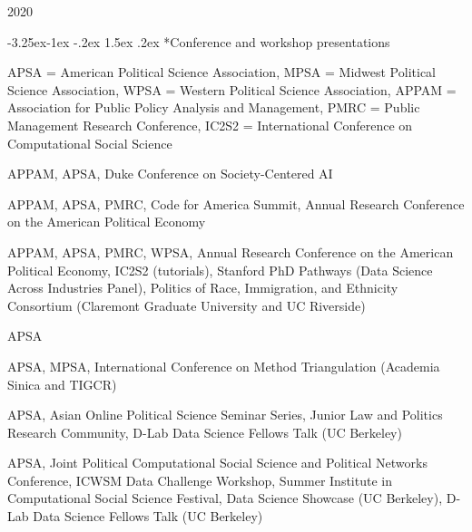 \documentclass[10pt, letterpaper]{article}
\makeatletter
\newenvironment{yearrow}[1]{%
  \begin{list}{}{%
    \setlength{\leftmargin}{4.4em}%
    \setlength{\labelwidth}{4.1em}%
    \setlength{\labelsep}{0.3em}%
    \setlength{\topsep}{0.3\baselineskip}%
    \setlength{\partopsep}{0pt}%
    \setlength{\itemsep}{0pt}%
    \setlength{\parsep}{0pt}%
  }%
  \item[{\textbf{#1}\hfill}]%
}{\end{list}}
\renewcommand\subsection{\@startsection{subsection}{2}{\z@}%
  {-3.25ex\@plus -1ex \@minus -.2ex}%
  {1.5ex \@plus .2ex}%
  {\normalfont\large\bfseries\color{cvnavy}}}
\makeatother
\begin{document}
\begin{talkyear}{2020}
\end{talkyear}

\subsection*{Conference and workshop presentations}

{\small APSA = American Political Science Association, MPSA = Midwest Political Science Association, WPSA = Western Political Science Association, APPAM = Association for Public Policy Analysis and Management, PMRC = Public Management Research Conference, IC2S2 = International Conference on Computational Social Science}

\begin{yearrow}{2026}
APPAM, APSA, Duke Conference on Society-Centered AI
\end{yearrow}

\begin{yearrow}{2025}
APPAM, APSA, PMRC, Code for America Summit, Annual Research Conference on the American Political Economy
\end{yearrow}

\begin{yearrow}{2024}
APPAM, APSA, PMRC, WPSA, Annual Research Conference on the American Political Economy, IC2S2 (tutorials), Stanford PhD Pathways (Data Science Across Industries Panel), Politics of Race, Immigration, and Ethnicity Consortium (Claremont Graduate University and UC Riverside)
\end{yearrow}

\begin{yearrow}{2023}
APSA
\end{yearrow}

\begin{yearrow}{2022}
APSA, MPSA, International Conference on Method Triangulation (Academia Sinica and TIGCR)
\end{yearrow}

\begin{yearrow}{2021}
APSA, Asian Online Political Science Seminar Series, Junior Law and Politics Research Community, D-Lab Data Science Fellows Talk (UC Berkeley)
\end{yearrow}

\begin{yearrow}{2020}
APSA, Joint Political Computational Social Science and Political Networks Conference, ICWSM Data Challenge Workshop, Summer Institute in Computational Social Science Festival, Data Science Showcase (UC Berkeley), D-Lab Data Science Fellows Talk (UC Berkeley)
\end{yearrow}
\end{document}
